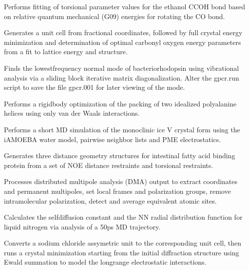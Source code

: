 \documentclass[letterpaper,11pt,english]{sphinxmanual}
\begin{document}
Performs fitting of torsional parameter values for the ethanol C\sphinxhyphen{}C\sphinxhyphen{}O\sphinxhyphen{}H bond based on relative quantum mechanical (G09) energies for rotating the C\sphinxhyphen{}O bond.


Generates a unit cell from fractional coordinates, followed by full crystal energy minimization and determination of optimal carbonyl oxygen energy parameters from a fit to lattice energy and structure.


Finds the lowest\sphinxhyphen{}frequency normal mode of bacteriorhodopsin using vibrational analysis via a sliding block iterative matrix diagonalization. Alter the gpcr.run script to save the file gpcr.001 for later viewing of the mode.


Performs a rigid\sphinxhyphen{}body optimization of the packing of two idealized polyalanine helices using only van der Waals interactions.


Performs a short MD simulation of the monoclinic ice V crystal form using the iAMOEBA water model, pairwise neighbor lists and PME electrostatics.


Generates three distance geometry structures for intestinal fatty acid binding protein from a set of NOE distance restraints and torsional restraints.


Processes distributed multipole analysis (DMA) output to extract coordinates and permanent multipoles, set local frames and polarization groups, remove intramolecular polarization, detect and average equivalent atomic sites.


Calculates the self\sphinxhyphen{}diffusion constant and the N\sphinxhyphen{}N radial distribution function for liquid nitrogen via analysis of a 50ps MD trajectory.


Converts a sodium chloride assymetric unit to the corresponding unit cell, then runs a crystal minimization starting from the initial diffraction structure using Ewald summation to model the long\sphinxhyphen{}range electrostatic interactions.
\end{document}

